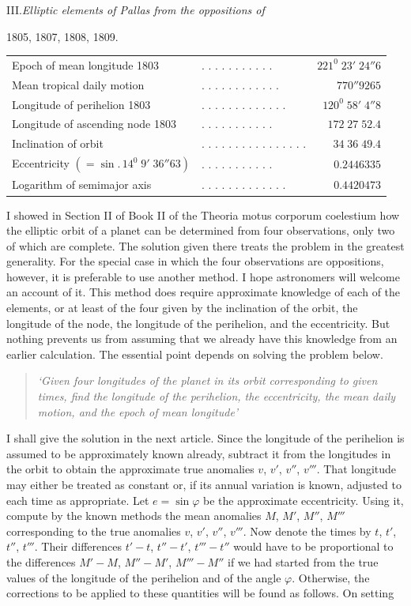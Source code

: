 \begin{center}III.\quad\textit{Elliptic elements of Pallas from the oppositions of}\par
1805, 1807, 1808, 1809.\end{center}
\begingroup\small\setlength{\tabcolsep}{2pt}
\noindent\begin{tabular}{@{}p{.51\linewidth}lr@{}}
Epoch of mean longitude 1803&. . . . . . . . . . .&$221^0\;23'\;24''6$\\
Mean tropical daily motion&. . . . . . . . . . . .&$770''9265$\\
Longitude of perihelion 1803&. . . . . . . . . . . . .&$120^0\;58'\;4''8$\\
Longitude of ascending node 1803&. . . . . . . . . . .&$172\;27\;52.4$\\
Inclination of orbit&. . . . . . . . . . . . . . . .&$34\;36\;49.4$\\
Eccentricity $(=\sin.\,14^0\;9'\;36''63)$&. . . . . . . . . . .&$0.2446335$\\
Logarithm of semimajor axis&. . . . . . . . . . . . .&$0.4420473$
\end{tabular}\par\endgroup
{}
I showed in Section II of Book II of the Theoria motus corporum coelestium how the elliptic orbit of a planet can be determined from four observations, only two of which are complete. The solution given there treats the problem in the greatest generality. For the special case in which the four observations are oppositions, however, it is preferable to use another method. I hope astronomers will welcome an account of it. This method does require approximate knowledge of each of the elements, or at least of the four given by the inclination of the orbit, the longitude of the node, the longitude of the perihelion, and the eccentricity. But nothing prevents us from assuming that we already have this knowledge from an earlier calculation. The essential point depends on solving the problem below.
\begin{quote}\itshape
‘Given four longitudes of the planet in its orbit corresponding to given times, find the longitude of the perihelion, the eccentricity, the mean daily motion, and the epoch of mean longitude’
\end{quote}
I shall give the solution in the next article.
Since the longitude of the perihelion is assumed to be approximately known already, subtract it from the longitudes in the orbit to obtain the approximate true anomalies $v$, $v'$, $v''$, $v'''$. That longitude may either be treated as constant or, if its annual variation is known, adjusted to each time as appropriate. Let $e=\sin\varphi$ be the approximate eccentricity. Using it, compute by the known methods the mean anomalies $M$, $M'$, $M''$, $M'''$ corresponding to the true anomalies $v$, $v'$, $v''$, $v'''$. Now denote the times by $t$, $t'$, $t''$, $t'''$. Their differences $t'-t$, $t''-t'$, $t'''-t''$ would have to be proportional to the differences $M'-M$, $M''-M'$, $M'''-M''$ if we had started from the true values of the longitude of the perihelion and of the angle $\varphi$. Otherwise, the corrections to be applied to these quantities will be found as follows. On setting

